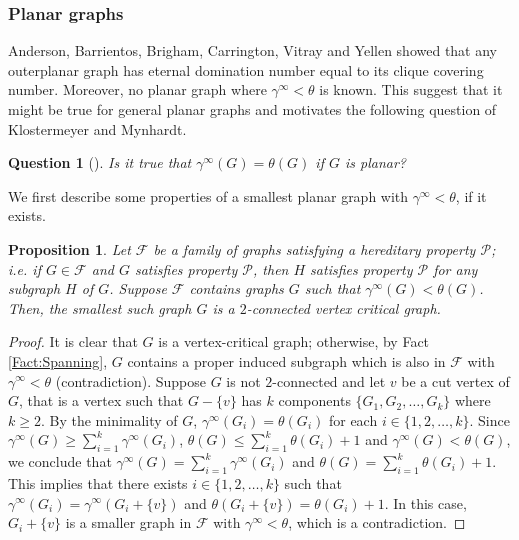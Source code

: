 \documentclass[11pt]{article}
\newtheorem{que}[thm]{Question}
\newtheorem{prop}[thm]{Proposition}
\begin{document}
	\subsubsection{Planar graphs} \label{Section:Planar}
	
	Anderson, Barrientos, Brigham, Carrington, Vitray and Yellen \cite{anderson2007maximum} showed that any outerplanar graph has eternal domination number equal to its clique covering number. Moreover, no planar graph where $\gamma^\infty<\theta$ is known. This suggest that it might be true for general planar graphs and motivates the following question of Klostermeyer and Mynhardt.
		
	\begin{que} [\cite{klostermeyer2016protecting}] \label{Question:Planar}
		Is it true that $\gamma^\infty(G)=\theta(G)$ if $G$ is planar?
	\end{que}

	We first describe some properties of a smallest planar graph with $\gamma^\infty<\theta$, if it exists.
	
	\begin{prop}
		Let $\mathcal{F}$ be a family of graphs satisfying a hereditary property $\mathcal{P}$; i.e. if $G \in \mathcal{F}$ and $G$ satisfies property $\mathcal{P}$, then $H$ satisfies property $\mathcal{P}$ for any subgraph $H$ of $G$. Suppose $\mathcal{F}$ contains graphs $G$ such that $\gamma^\infty(G)<\theta(G)$. Then, the smallest such graph $G$ is a $2$-connected vertex critical graph.
	\end{prop}

	\begin{proof}
		It is clear that $G$ is a vertex-critical graph; otherwise, by Fact \ref{Fact:Spanning}, $G$ contains a proper induced subgraph which is also in $\mathcal{F}$ with $\gamma^\infty<\theta$ (contradiction). Suppose $G$ is not $2$-connected and let $v$ be a cut vertex of $G$, that is a vertex such that $G-\{v\}$ has $k$ components $\{G_1, G_2, \ldots, G_k\}$ where $k\geq2$. By the minimality of $G$, $\gamma^\infty(G_i)=\theta(G_i)$ for each $i \in \{1,2,\ldots,k\}$. Since $\gamma^\infty(G) \geq \sum_{i=1}^k \gamma^\infty(G_i)$, $\theta(G) \leq \sum_{i=1}^k \theta(G_i)+1$ and $\gamma^\infty(G)<\theta(G)$, we conclude that $\gamma^\infty(G) = \sum_{i=1}^k \gamma^\infty(G_i)$ and $\theta(G) = \sum_{i=1}^k \theta(G_i)+1$. This implies that there exists $i \in \{1,2,\ldots,k\}$ such that $\gamma^\infty(G_i)=\gamma^\infty(G_i+\{v\})$ and $\theta(G_i+\{v\})=\theta(G_i)+1$. In this case, $G_i+\{v\}$ is a smaller graph in $\mathcal{F}$ with $\gamma^\infty<\theta$, which is a contradiction.
	\end{proof}
	
\end{document}

